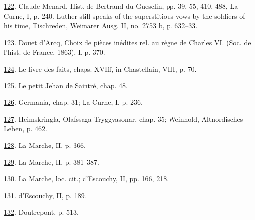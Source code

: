 \protect\hypertarget{23_NOTES.xhtmlux5cux23id_1692}{\protect\hyperlink{10_Chapter_Three__THE_HEROIC_DREAM.xhtmlux5cux23id_1691}{122}}.
Claude Menard, Hist. de Bertrand du Guesclin, pp. 39, 55, 410, 488, La
Curne, I, p. 240. Luther still speaks of the superstitious vows by the
soldiers of his time, Tischreden, Weimarer Ausg. II, no. 2753 b, p.
632--33.

\protect\hypertarget{23_NOTES.xhtmlux5cux23id_1690}{\protect\hyperlink{10_Chapter_Three__THE_HEROIC_DREAM.xhtmlux5cux23id_1689}{123}}.
Douet d'Arcq, Choix de pièces inédites rel. au règne de Charles VI.
(Soc. de l'hist. de France, 1863), I, p. 370.

\protect\hypertarget{23_NOTES.xhtmlux5cux23id_1688}{\protect\hyperlink{10_Chapter_Three__THE_HEROIC_DREAM.xhtmlux5cux23id_1687}{124}}.
Le livre des faits, chaps. XVIff, in Chastellain, VIII, p. 70.

\protect\hypertarget{23_NOTES.xhtmlux5cux23id_1686}{\protect\hyperlink{10_Chapter_Three__THE_HEROIC_DREAM.xhtmlux5cux23id_1685}{125}}.
Le petit Jehan de Saintré, chap. 48.

\protect\hypertarget{23_NOTES.xhtmlux5cux23id_1684}{\protect\hyperlink{10_Chapter_Three__THE_HEROIC_DREAM.xhtmlux5cux23id_1683}{126}}.
Germania, chap. 31; La Curne, I, p. 236.

\protect\hypertarget{23_NOTES.xhtmlux5cux23id_1682}{\protect\hyperlink{10_Chapter_Three__THE_HEROIC_DREAM.xhtmlux5cux23id_1681}{127}}.
Heimskringla, Olafssaga Tryggvasonar, chap. 35; Weinhold, Altnordisches
Leben, p. 462.

\protect\hypertarget{23_NOTES.xhtmlux5cux23id_1680}{\protect\hyperlink{10_Chapter_Three__THE_HEROIC_DREAM.xhtmlux5cux23id_1679}{128}}.
La Marche, II, p. 366.

\protect\hypertarget{23_NOTES.xhtmlux5cux23id_1678}{\protect\hyperlink{10_Chapter_Three__THE_HEROIC_DREAM.xhtmlux5cux23id_1677}{129}}.
La Marche, II, p. 381--387.

\protect\hypertarget{23_NOTES.xhtmlux5cux23id_1676}{\protect\hyperlink{10_Chapter_Three__THE_HEROIC_DREAM.xhtmlux5cux23id_1675}{130}}.
La Marche, loc. cit.; d'Escouchy, II, pp. 166, 218.

\protect\hypertarget{23_NOTES.xhtmlux5cux23id_1674}{\protect\hyperlink{10_Chapter_Three__THE_HEROIC_DREAM.xhtmlux5cux23id_1673}{131}}.
d'Escouchy, II, p. 189.

\protect\hypertarget{23_NOTES.xhtmlux5cux23id_1672}{\protect\hyperlink{10_Chapter_Three__THE_HEROIC_DREAM.xhtmlux5cux23id_1671}{132}}.
Doutrepont, p. 513.

